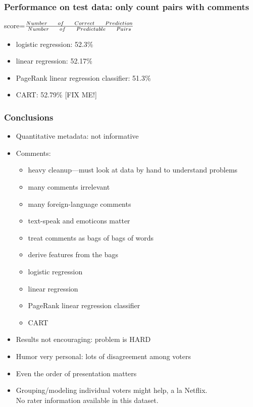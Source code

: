 \documentclass[fleqn]{beamer}
\begin{document}
\begin{frame}
\frametitle{Performance on test data: only count pairs with comments}
\begin{beamerboxesrounded}{}
	\begin{center}
	 score=$\frac{Number \indent of \indent Correct \indent Prediction}{Number \indent of \indent Predictable \indent Pairs}$
         \end{center}
	\end{beamerboxesrounded}
      \begin{itemize}
        \item logistic regression: 52.3\%
        \item linear regression: 52.17\%
        \item PageRank linear regression classifier: 51.3\%
        \item CART: 52.79\% [FIX ME!]
    \end{itemize}

\end{frame}

\begin{frame}
\frametitle{Conclusions}
    \begin{itemize}
        \item Quantitative metadata: not informative
        \item Comments: 
        	\begin{itemize}
	   \item heavy cleanup---must look at data by hand to understand problems
	   \item many comments irrelevant
	   \item many foreign-language comments
	   \item text-speak and emoticons matter
	   \item treat comments as bags of bags of words
	   \item derive features from the bags
	   \item logistic regression
	   \item linear regression
	   \item PageRank linear regression classifier
	   \item CART
	\end{itemize}
       \item Results not encouraging: problem is HARD
       \item Humor very personal: lots of disagreement among voters
       \item Even the order of presentation matters
       \item Grouping/modeling individual voters might help, a la Netflix. \\
                No rater information available in this dataset.
    \end{itemize}

\end{frame}
\end{document}
